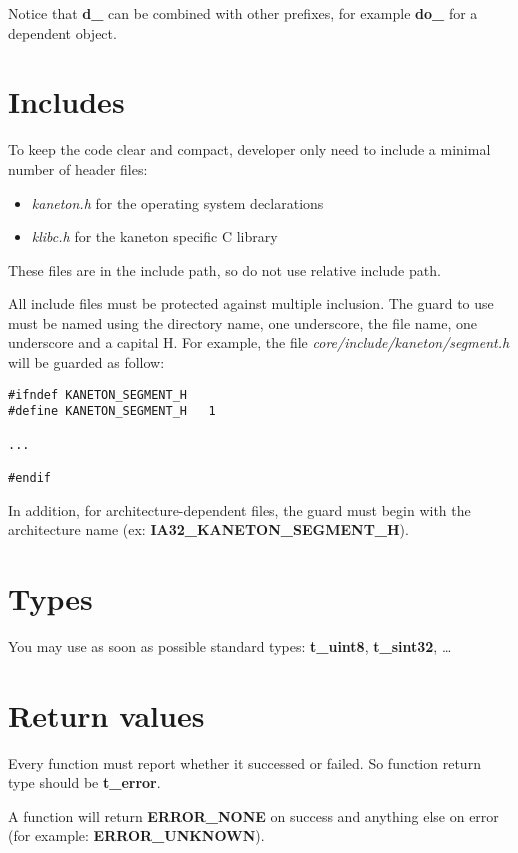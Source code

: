 Notice  that \textbf{d\_}  can be  combined with  other  prefixes, for
example \textbf{do\_} for a dependent object.

\section*{Includes}

To keep the  code clear and compact, developer only  need to include a
minimal number of header files:

\begin{itemize}
\item \textit{kaneton.h} for the operating system declarations
\item \textit{klibc.h} for the kaneton specific C library
\end{itemize}

These files  are in the include  path, so do not  use relative include
path.

All include  files must be  protected against multiple  inclusion. The
guard to use  must be named using the  directory name, one underscore,
the file name,  one underscore and a capital H.  For example, the file
\textit{core/include/kaneton/segment.h} will be guarded as follow:

\begin{verbatim}
#ifndef KANETON_SEGMENT_H
#define KANETON_SEGMENT_H	1

...

#endif
\end{verbatim}

In addition,  for architecture-dependent  files, the guard  must begin
with the architecture name (ex: \textbf{IA32\_KANETON\_SEGMENT\_H}).

\section*{Types}

You  may use  as  soon as  possible  standard types:  \textbf{t\_uint8},
\textbf{t\_sint32}, \ldots{}

\section*{Return values}

Every function must report whether it successed or failed. So function
return type should be \textbf{t\_error}.

A function  will return  \textbf{ERROR\_NONE} on success  and anything
else on error (for example: \textbf{ERROR\_UNKNOWN}).


